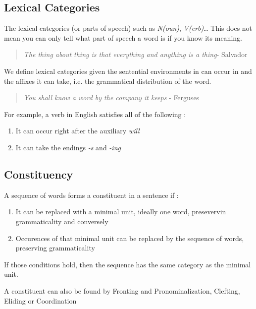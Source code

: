 \documentclass{cours}
\begin{document}
\subsection{Lexical Categories}
The lexical categories (or parts of speech) such as \textsl{N(oun)}, \textsl{V(erb)}\dots 
This does not mean you can only tell what part of speech a word is if you know its meaning.\\
\begin{quotation}
    \og \textit{The thing about thing is that everything and anything is a thing}\fg - Salvador
\end{quotation}

\begin{definition}
    We define lexical categories given the sentential environments in can occur in and the affixes it can take, i.e. the grammatical distribution of the word.
\end{definition}
\begin{quotation}
    \og \textit{You shall know a word by the company it keeps} \fg - Ferguses
\end{quotation}
For example, a verb in English satisfies all of the following :
\begin{enumerate}
    \item It can occur right after the auxiliary \textsl{will}
    \item It can take the endings \textsl{-s} and \textsl{-ing}
\end{enumerate}

\subsection{Constituency}
\begin{definition}[A Heuristic]
    A sequence of words forms a constituent in a sentence if :
    \begin{enumerate}
        \item It can be replaced with a minimal unit, ideally one word, presevervin grammaticality and conversely
        \item Occurences of that minimal unit can be replaced by the sequence of words, preserving grammaticality
    \end{enumerate}
    If those conditions hold, then the sequence has the same category as the minimal unit. 
\end{definition}

A constituent can also be found by Fronting and Pronominalization, Clefting, Eliding or Coordination
\end{document}
